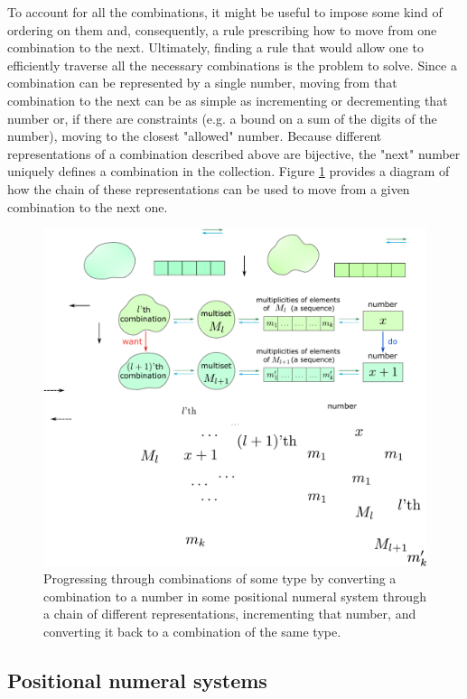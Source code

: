 \documentclass[12pt]{article}
\begin{document}
To account for all the combinations, it might be useful to impose some kind of ordering on them and, consequently, a rule prescribing how to move from one combination to the next. Ultimately, finding a rule that would allow one to efficiently traverse all the necessary combinations is the problem to solve. Since a combination can be represented by a single number, moving from that combination to the next can be as simple as incrementing or decrementing that number or, if there are constraints (e.g. a bound on a sum of the digits of the number), moving to the closest "allowed" number. Because different representations of a combination described above are bijective, the "next" number uniquely defines a combination in the collection. Figure \ref{fig:diag1} provides a diagram of how the chain of these representations can be used to move from a given combination to the next one. 

\begin{figure}
  \centering
  \includegraphics[scale = 0.81]{suppl/diagram1a.pdf}
  \caption{Progressing through combinations of some type by converting a combination to a number in some positional numeral system through a chain of different representations, incrementing that number, and converting it back to a combination of the same type.}
  \label{fig:diag1}
\end{figure}

\subsection*{Positional numeral systems}
\end{document}

